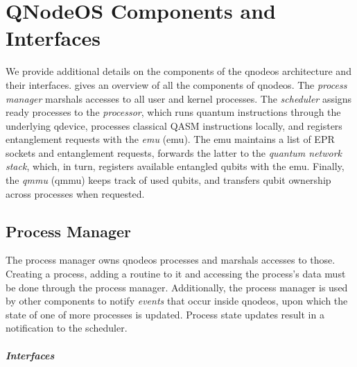 \chapter{QNodeOS Components and Interfaces}
\label{app:qnodeos}

We provide additional details on the components of the \acrshort{qnodeos} architecture and their
interfaces.  gives an overview of all the components of \acrshort{qnodeos}.
The \emph{process manager} marshals accesses to all user and kernel processes. The \emph{scheduler}
assigns ready processes to the \emph{processor}, which runs quantum instructions through the
underlying \acrshort{qdevice}, processes classical QASM instructions locally, and registers
entanglement requests with the \emph{\acrlong{emu}} (\acrshort{emu}). The \acrshort{emu} maintains a
list of EPR sockets and entanglement requests, forwards the latter to the \emph{quantum network
stack}, which, in turn, registers available entangled qubits with the \acrshort{emu}. Finally, the
\emph{\acrlong{qmmu}} (\acrshort{qmmu}) keeps track of used qubits, and transfers qubit ownership
across processes when requested.

\section{Process Manager}

The process manager owns \acrshort{qnodeos} processes and marshals accesses to those. Creating a
process, adding a routine to it and accessing the process's data must be done through the process
manager. Additionally, the process manager is used by other components to notify \emph{events} that
occur inside \acrshort{qnodeos}, upon which the state of one of more processes is updated. Process
state updates result in a notification to the scheduler.

\paragraph{Interfaces}

